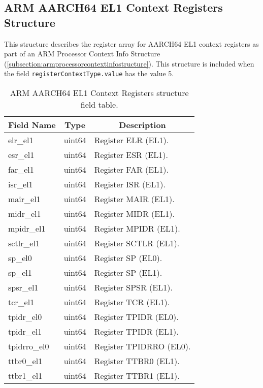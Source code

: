 \documentclass{report}
\newcommand*{\thead}[1]{\multicolumn{1}{|c|}{\bfseries #1}}
\newcommand*{\jsontable}[1]{
    \begin{table}[!ht]
    \label{#1}
    \centering
    \begin{adjustbox}{center}
    \begin{tabular}{|l|c|p{8cm}|}
    \hline
    \thead{Field Name} & \thead{Type} & \thead{Description} \\
    \hline
}
\newcommand*{\jsontableend}[1]{
    \hline
    \end{tabular}
    \end{adjustbox}
    \caption{#1}
    \label{table:#1}
    \end{table}
    \FloatBarrier
}
\begin{document}
\subsection{ARM AARCH64 EL1 Context Registers Structure}
\label{subsection:armaarch64el1contextregistersstructure}
This structure describes the register array for AARCH64 EL1 context registers as part of an ARM Processor Context Info Structure (\ref{subsection:armprocessorcontextinfostructure}). This structure is included when the field \texttt{registerContextType.value} has the value 5.
\jsontable{table:armaarch64el1contextregistersstructure}
elr\_el1 & uint64 & Register ELR (EL1).\\
\hline
esr\_el1 & uint64 & Register ESR (EL1).\\
\hline
far\_el1 & uint64 & Register FAR (EL1).\\
\hline
isr\_el1 & uint64 & Register ISR (EL1).\\
\hline
mair\_el1 & uint64 & Register MAIR (EL1).\\
\hline
midr\_el1 & uint64 & Register MIDR (EL1).\\
\hline
mpidr\_el1 & uint64 & Register MPIDR (EL1).\\
\hline
sctlr\_el1 & uint64 & Register SCTLR (EL1).\\
\hline
sp\_el0 & uint64 & Register SP (EL0).\\
\hline
sp\_el1 & uint64 & Register SP (EL1).\\
\hline
spsr\_el1 & uint64 & Register SPSR (EL1).\\
\hline
tcr\_el1 & uint64 & Register TCR (EL1).\\
\hline
tpidr\_el0 & uint64 & Register TPIDR (EL0).\\
\hline
tpidr\_el1 & uint64 & Register TPIDR (EL1).\\
\hline
tpidrro\_el0 & uint64 & Register TPIDRRO (EL0).\\
\hline
ttbr0\_el1 & uint64 & Register TTBR0 (EL1).\\
\hline
ttbr1\_el1 & uint64 & Register TTBR1 (EL1).\\
\jsontableend{ARM AARCH64 EL1 Context Registers structure field table.}

\end{document}
